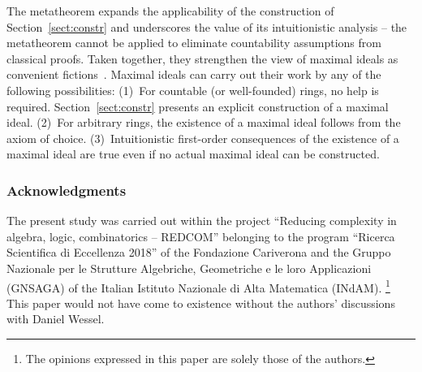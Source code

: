\documentclass[envcountsect,envcountsame,runningheads]{llncs}
\renewcommand{\_}{\mathpunct{.}\,}
\begin{document}
The metatheorem expands the applicability of the construction of
Section~\ref{sect:constr} and underscores the value of its intuitionistic
analysis -- the metatheorem cannot be applied to eliminate countability assumptions from classical proofs.
Taken together, they strengthen the
view of maximal ideals as convenient fictions~\cite[Section~1]{schuster-wessel:krull}. Maximal ideals can
carry out their work by any of the following possibilities:
(1)~For countable (or well-founded) rings, no help is required.
Section~\ref{sect:constr} presents an explicit construction of a maximal ideal.
(2)~For arbitrary rings, the existence of a maximal ideal follows from the
axiom of choice.
(3)~Intuitionistic first-order consequences of the existence of a maximal
ideal are true even if no actual maximal ideal can be constructed.

\subsubsection{Acknowledgments}
The present study was carried out within the project ``Reducing complexity in
algebra, logic, combinatorics -- REDCOM'' belonging to the program ``Ricerca
Scientifica di Eccellenza 2018'' of the Fondazione Cariverona and the Gruppo
Nazionale per le Strutture Algebriche, Geometriche e le loro Applicazioni
(GNSAGA) of the Italian Istituto Nazionale di Alta Matematica (INdAM).%
\footnote{The opinions expressed in this paper are solely those of the
authors.} This paper would not have come to existence
without the authors' discussions with Daniel Wessel.



\end{document}

